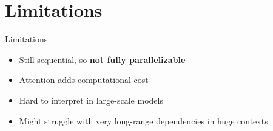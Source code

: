 \section{Limitations}
\begin{frame}{Limitations}
  \begin{itemize}
    \item[$\blacktriangleright$] Still sequential, so \textbf{not fully parallelizable}
    \item[$\blacktriangleright$] Attention adds computational cost
    \item[$\blacktriangleright$] Hard to interpret in large-scale models
    \item[$\blacktriangleright$] Might struggle with very long-range dependencies in huge contexts
  \end{itemize}
\end{frame}
